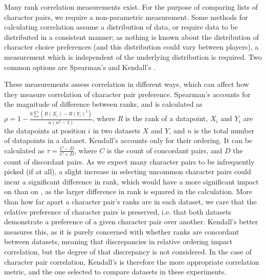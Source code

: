 Many rank correlation measurements exist. For the purpose of comparing lists of
character pairs, we require a non-parametric measurement. Some methods for
calculating correlation assume a distribution of data, or require data to be
distributed in a consistent manner; as nothing is known about the distribution
of character choice preferences (and this distribution could vary between
players), a measurement which is independent of the underlying distribution is
required. Two common options are Spearman's \rho and Kendall's \tau.

These measurements assess correlation in different ways, which can affect how
they measure correlation of character pair preference. Spearman's \rho accounts
for the magnitude of difference between ranks, and is calculated as $\rho = 1 -
\frac{6 \sum (R(X_{i}) - R(Y_{i})^{2})}{n(n^{2}-1)}$, where $R$ is the rank of a
datapoint, $X_{i}$ and $Y_{i}$ are the datapoints at position $i$ in two
datasets $X$ and $Y$, and $n$ is the total number of datapoints in a dataset.
Kendall's \tau{} accounts only for their ordering. It can be calculated as $\tau
= \frac{C - D}{C + D}$, where $C$ is the count of concordant pairs, and $D$ the
count of discordant pairs. As we expect many character pairs to be infrequently
picked (if at all), a slight increase in selecting uncommon character pairs
could incur a significant difference in rank, which would have a more
significant impact on \rho{} than on \tau{}, as the larger difference in rank is
squared in the calculation. More than how far apart a character pair's ranks are
in each dataset, we care that the relative preference of character pairs is
preserved, i.e. that both datasets demonstrate a preference of a given character
pair over another. Kendall's \tau{} better measures this, as it is purely
concerned with whether ranks are concordant between datasets, meaning that
discrepancies in relative ordering impact correlation, but the degree of that
discrepancy is not considered. In the case of character pair correlation,
Kendall's \tau{} is therefore the more appropriate correlation metric, and the
one selected to compare datasets in these experiments. 



